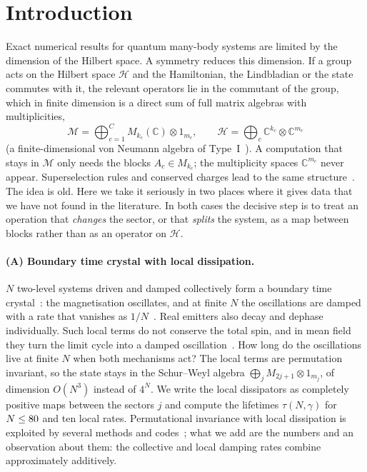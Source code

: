 \documentclass[11pt]{article}
\newcommand{\C}{\mathbb{C}}
\newcommand{\M}{\mathcal{M}}
\begin{document}
\section{Introduction}\label{sec:intro}

Exact numerical results for quantum many-body systems are limited by the dimension of the Hilbert space. A symmetry
reduces this dimension. If a group acts on the Hilbert space $\mathcal H$ and the Hamiltonian, the Lindbladian or the
state commutes with it, the relevant operators lie in the commutant of the group, which in finite dimension is a direct
sum of full matrix algebras with multiplicities,
\begin{equation}\label{eq:typeI}
  \M=\bigoplus_{c=1}^{C}M_{k_c}(\C)\otimes1_{m_c},\qquad \mathcal H=\bigoplus_c\C^{k_c}\otimes\C^{m_c}
\end{equation}
(a finite-dimensional von Neumann algebra of Type~I~\cite{takesaki2002}). A computation that stays in $\M$ only needs
the blocks $A_c\in M_{k_c}$; the multiplicity spaces $\C^{m_c}$ never appear. Superselection rules and conserved charges
lead to the same structure~\cite{bartlett2007}. The idea is old. Here we take it seriously in two places where it gives
data that we have not found in the literature. In both cases the decisive step is to treat an operation that
\emph{changes} the sector, or that \emph{splits} the system, as a map between blocks rather than as an operator on
$\mathcal H$.

\paragraph{(A) Boundary time crystal with local dissipation.} $N$ two-level systems driven and damped collectively form a
boundary time crystal~\cite{iemini2018}: the magnetisation oscillates, and at finite $N$ the oscillations are damped
with a rate that vanishes as $1/N$~\cite{liu2026,nemeth2025}. Real emitters also decay and dephase individually. Such
local terms do not conserve the total spin, and in mean field they turn the limit cycle into a damped
oscillation~\cite{piccitto2021}. How long do the oscillations live at finite $N$ when both mechanisms act? The local
terms are permutation invariant, so the state stays in the Schur--Weyl algebra $\bigoplus_jM_{2j+1}\otimes1_{m_j}$, of
dimension $O(N^3)$ instead of $4^N$. We write the local dissipators as completely positive maps between the sectors $j$
and compute the lifetimes $\tau(N,\gamma)$ for $N\le80$ and ten local rates. Permutational invariance with local
dissipation is exploited by several methods and codes~\cite{chase2008,baragiola2010,gegg2017,kirton2017,shammah2018};
what we add are the numbers and an observation about them: the collective and local damping rates combine
approximately additively.
\end{document}
